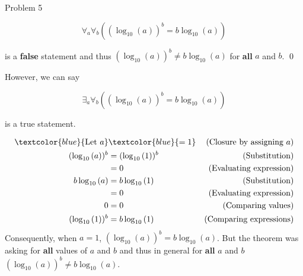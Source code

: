 \begin{problem}{Problem 5}
\begin{highlight}[Solution]
        \begin{equation*}
            \forall_{a}\forall_{b}((\log_{10}{(a)})^{b} = b\log_{10}{(a)})
        \end{equation*}

        is a \textbf{false} statement and thus $(\log_{10}{(a)})^{b} \neq b\log_{10}{(a)}$ for \textbf{all} $a$ and $b$. \qed \vspace*{1em}


        However, we can say 

        \begin{equation*}
            \exists_{a}\forall_{b}((\log_{10}{(a)})^{b} = b\log_{10}{(a)})
        \end{equation*}

        is a true statement. \vspace*{1em}

        \begin{align*}
            \textcolor{blue}{\text{Let } a } & \textcolor{blue}{ = 1} & \text{(Closure by assigning $a$)} \\
            (\log_{10}{(a)})^{b} & = (\log_{10}{(1)})^{b} & \text{(Substitution)} \\
            & = 0 & \text{(Evaluating expression)} \\
            b\log_{10}{(a)} & = b\log_{10}{(1)} & \text{(Substitution)} \\
            & = 0 & \text{(Evaluating expression)} \\
            0 & = 0 & \text{(Comparing values)} \\
            (\log_{10}{(1)})^{b} & = b\log_{10}{(1)} & \text{(Comparing expressions)}
        \end{align*}
        Consequently, when $a = 1$, $(\log_{10}{(a)})^{b} = b\log_{10}{(a)}$. But the theorem was asking for \textbf{all} values of $a$ and $b$ and thus in general for \textbf{all} $a$ and $b$ 
        $(\log_{10}{(a)})^{b} \neq b\log_{10}{(a)}$.
    \end{highlight}
\end{problem}

